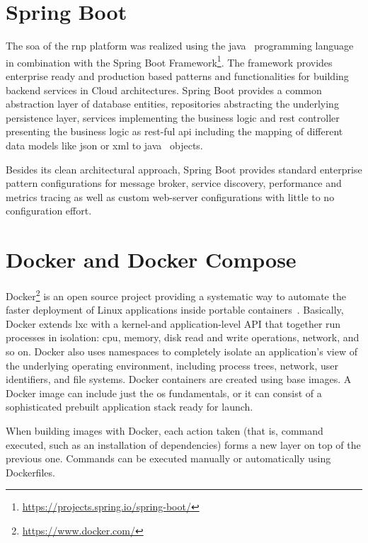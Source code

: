 \documentclass[
a4paper,
twoside,
headsepline,
cleardoublepage=empty,
parskip=half,
draft=false
]{scrbook}
\begin{document}
		\section{Spring Boot}\label{sec:spring_boot}

			The \gls{soa} of the \gls{rnp} platform was realized using the \gls{java}~\cite{java2015} programming language in combination with the Spring Boot Framework\footnote{\url{https://projects.spring.io/spring-boot/}}. The framework provides enterprise ready and production based patterns and functionalities for building backend services in Cloud architectures. Spring Boot provides a common abstraction layer of database entities, repositories abstracting the underlying persistence layer, services implementing the business logic and \gls{rest} controller presenting the business logic as \gls{rest}-ful \gls{api} including the mapping of different data models like \gls{json} or \gls{xml} to \gls{java}~\cite{java2015} objects.
			
			Besides its clean architectural approach, Spring Boot provides standard enterprise pattern configurations for message broker, service discovery, performance and metrics tracing as well as custom web-server configurations with little to no configuration effort.

		\section{Docker and Docker Compose}\label{sec:docker}
		
			Docker\footnote{\url{https://www.docker.com/}} is an open source project providing a systematic way to automate the faster deployment of Linux applications inside portable containers~\cite{bernstein2014containers}. 
			Basically, Docker extends \gls{lxc} with a kernel-and application-level API that together run processes in isolation: \gls{cpu}, memory, disk read and write operations, network, and so on. 
			Docker also uses namespaces to completely isolate an application’s view of the underlying operating environment, including process trees, network, user identifiers, and file systems.
			Docker containers are created using base images.
			A Docker image can include just the \gls{os} fundamentals, or it can consist of a sophisticated prebuilt application stack ready for launch. 
			
			When building images with Docker, each action taken (that is, command executed, such as an installation of dependencies) forms a new layer on top of the previous one. 
			Commands can be executed manually or automatically using Dockerfiles.
			
\end{document}
